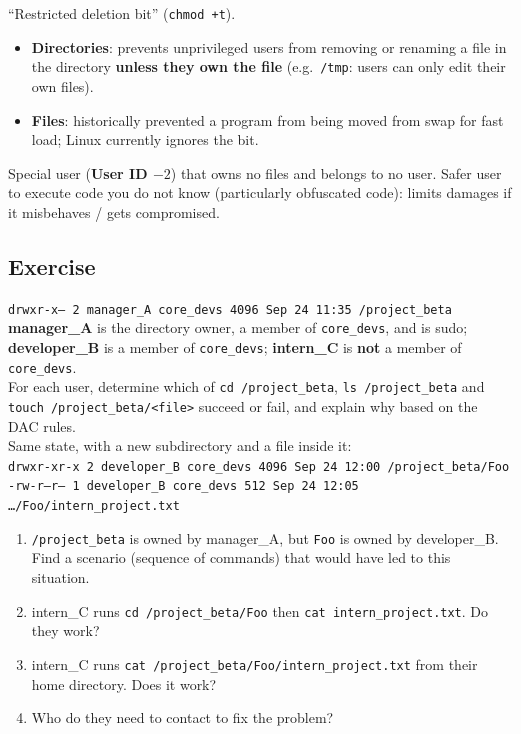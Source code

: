 \begin{defnbox}[title=Sticky bit]
``Restricted deletion bit'' (\texttt{chmod +t}).
\begin{itemize}
  \item \textbf{Directories}: prevents unprivileged users from removing or renaming a
        file in the directory \textbf{unless they own the file} (e.g.\ \texttt{/tmp}:
        users can only edit their own files).
  \item \textbf{Files}: historically prevented a program from being moved from swap
        for fast load; Linux currently ignores the bit.
\end{itemize}
\end{defnbox}

\begin{defnbox}[title=Nobody]
Special user (\textbf{User ID $-2$}) that owns no files and belongs to no user. Safer
user to execute code you do not know (particularly obfuscated code): limits damages if it
misbehaves / gets compromised.
\end{defnbox}

\subsection{Exercise}

\begin{exbox}[title={Exercise --- ACL in Linux}]
\texttt{drwxr-x--- 2 manager\_A core\_devs 4096 Sep 24 11:35 /project\_beta} \\
\textbf{manager\_A} is the directory owner, a member of \texttt{core\_devs}, and is
sudo; \textbf{developer\_B} is a member of \texttt{core\_devs}; \textbf{intern\_C} is
\textbf{not} a member of \texttt{core\_devs}. \\
For each user, determine which of \texttt{cd /project\_beta}, \texttt{ls /project\_beta}
and \texttt{touch /project\_beta/<file>} succeed or fail, and explain why based on the DAC
rules. \\[4pt]
Same state, with a new subdirectory and a file inside it: \\
\texttt{drwxr-xr-x 2 developer\_B core\_devs 4096 Sep 24 12:00 /project\_beta/Foo} \\
\texttt{-rw-r--r-- 1 developer\_B core\_devs 512 Sep 24 12:05 \ldots/Foo/intern\_project.txt}
\begin{enumerate}[label=Q\arabic*:]
  \item \texttt{/project\_beta} is owned by manager\_A, but \texttt{Foo} is owned by
        developer\_B. Find a scenario (sequence of commands) that would have led to this
        situation.
  \item intern\_C runs \texttt{cd /project\_beta/Foo} then
        \texttt{cat intern\_project.txt}. Do they work?
  \item intern\_C runs \texttt{cat /project\_beta/Foo/intern\_project.txt} from their
        home directory. Does it work?
  \item Who do they need to contact to fix the problem?
\end{enumerate}
\end{exbox}

